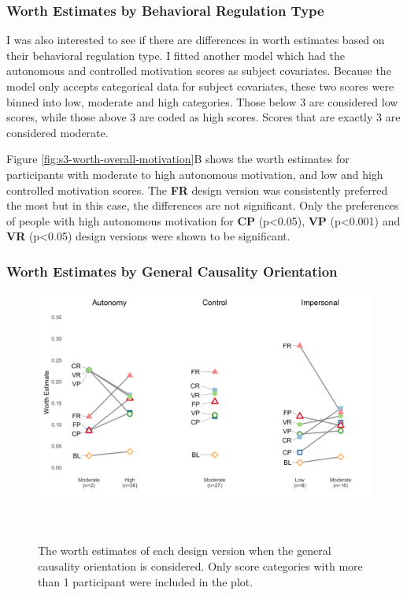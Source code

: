 \subsubsection{Worth Estimates by Behavioral Regulation Type}
I was also interested to see if there are differences in worth estimates based on their behavioral regulation type. I fitted another model which had the autonomous and controlled motivation scores as subject covariates. Because the model only accepts categorical data for subject covariates, these two scores were binned into low, moderate and high categories. Those below 3 are considered low scores, while those above 3 are coded as high scores. Scores that are exactly 3 are considered moderate. 

Figure \ref{fig:s3-worth-overall-motivation}B shows the worth estimates for participants with moderate to high autonomous motivation, and low and high controlled motivation scores. The \textbf{FR} design version was consistently preferred the most but in this case, the differences are not significant. Only the preferences of people with high autonomous motivation for \textbf{CP} (p<0.05), \textbf{VP} (p<0.001) and \textbf{VR} (p<0.05) design versions were shown to be significant. 

\subsubsection{Worth Estimates by General Causality Orientation}
\begin{figure}[h]
\centering
  \includegraphics[scale=.18]{figures/s3-worth-gcos.png}
  \caption{The worth estimates of each design version when the general causality orientation is considered. Only score categories with more than 1 participant were included in the plot.}~\label{fig:s3-worth-gcos}
\end{figure}

